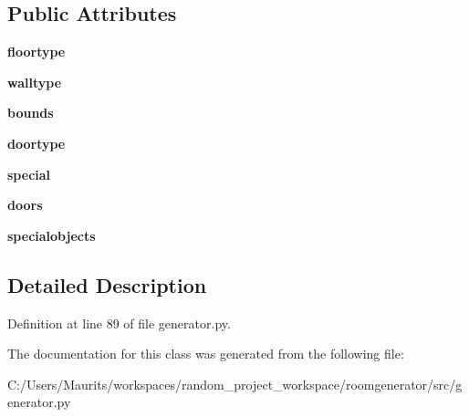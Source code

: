 \subsection*{Public Attributes}
\begin{DoxyCompactItemize}
\item 
\hypertarget{classgenerator_1_1_room_a58eab9630dcdc9c752eab10e64d882bf}{}{\bfseries floortype}\label{classgenerator_1_1_room_a58eab9630dcdc9c752eab10e64d882bf}

\item 
\hypertarget{classgenerator_1_1_room_aa59929bdecbc0c56a21d4c60fc303cd7}{}{\bfseries walltype}\label{classgenerator_1_1_room_aa59929bdecbc0c56a21d4c60fc303cd7}

\item 
\hypertarget{classgenerator_1_1_room_a3d1e1de7d8e411f5e474d54fe50f7c60}{}{\bfseries bounds}\label{classgenerator_1_1_room_a3d1e1de7d8e411f5e474d54fe50f7c60}

\item 
\hypertarget{classgenerator_1_1_room_a8481093da242ff01f70af65b43e9ecaa}{}{\bfseries doortype}\label{classgenerator_1_1_room_a8481093da242ff01f70af65b43e9ecaa}

\item 
\hypertarget{classgenerator_1_1_room_ae3b9e5ff2053418b7c56df28c3dfd85d}{}{\bfseries special}\label{classgenerator_1_1_room_ae3b9e5ff2053418b7c56df28c3dfd85d}

\item 
\hypertarget{classgenerator_1_1_room_a92a71c77c02820713c8ce7a820c961fa}{}{\bfseries doors}\label{classgenerator_1_1_room_a92a71c77c02820713c8ce7a820c961fa}

\item 
\hypertarget{classgenerator_1_1_room_a551f6ca2275e61bd6de787137443f878}{}{\bfseries specialobjects}\label{classgenerator_1_1_room_a551f6ca2275e61bd6de787137443f878}

\end{DoxyCompactItemize}


\subsection{Detailed Description}


Definition at line 89 of file generator.\+py.



The documentation for this class was generated from the following file\+:\begin{DoxyCompactItemize}
\item 
C\+:/\+Users/\+Maurits/workspaces/random\+\_\+project\+\_\+workspace/roomgenerator/src/generator.\+py\end{DoxyCompactItemize}
